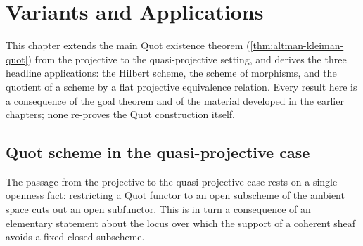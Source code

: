
\chapter{Variants and Applications}
\label{chap:variants}

This chapter extends the main Quot existence theorem
(\cref{thm:altman-kleiman-quot}) from the projective to the quasi-projective
setting, and derives the three headline applications: the Hilbert scheme, the
scheme of morphisms, and the quotient of a scheme by a flat projective
equivalence relation. Every result here is a consequence of the goal theorem
and of the material developed in the earlier chapters; none re-proves the Quot
construction itself.

\section{Quot scheme in the quasi-projective case}

The passage from the projective to the quasi-projective case rests on a single
openness fact: restricting a Quot functor to an open subscheme of the ambient
space cuts out an open subfunctor. This is in turn a consequence of an
elementary statement about the locus over which the support of a coherent sheaf
avoids a fixed closed subscheme.

